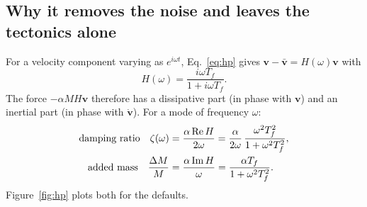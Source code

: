 \documentclass[11pt]{article}
\newcommand{\vbar}{\bar{\mathbf v}}
\begin{document}
\subsection{Why it removes the noise and leaves the tectonics alone}
For a velocity component varying as $e^{i\omega t}$, Eq.~\eqref{eq:hp} gives
$\mathbf v-\vbar = H(\omega)\mathbf v$ with
\begin{equation}
  H(\omega)=\frac{i\omega T_f}{1+i\omega T_f}.
\end{equation}
The force $-\alpha M H\mathbf v$ therefore has a dissipative part (in phase with $\mathbf v$) and
an inertial part (in phase with $\dot{\mathbf v}$). For a mode of frequency $\omega$:
\begin{align}
  \text{damping ratio}\quad \zeta(\omega) &= \frac{\alpha\,{\rm Re}\,H}{2\omega}
     = \frac{\alpha}{2\omega}\,\frac{\omega^2T_f^2}{1+\omega^2T_f^2},\\
  \text{added mass}\quad \frac{\Delta M}{M} &= \frac{\alpha\,{\rm Im}\,H}{\omega}
     = \frac{\alpha T_f}{1+\omega^2T_f^2}.
\end{align}
Figure~\ref{fig:hp} plots both for the defaults.
\end{document}
